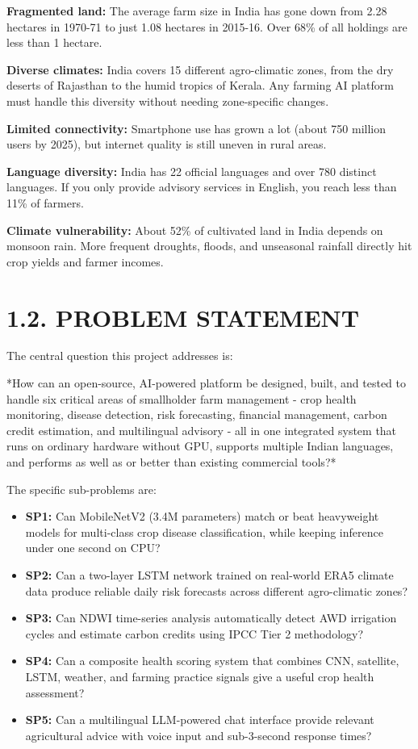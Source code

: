 \documentclass[12pt, a4paper]{report}
\begin{document}
\textbf{Fragmented land:} The average farm size in India has gone down from 2.28 hectares in 1970-71 to just 1.08 hectares in 2015-16. Over 68\% of all holdings are less than 1 hectare.

\textbf{Diverse climates:} India covers 15 different agro-climatic zones, from the dry deserts of Rajasthan to the humid tropics of Kerala. Any farming AI platform must handle this diversity without needing zone-specific changes.

\textbf{Limited connectivity:} Smartphone use has grown a lot (about 750 million users by 2025), but internet quality is still uneven in rural areas.

\textbf{Language diversity:} India has 22 official languages and over 780 distinct languages. If you only provide advisory services in English, you reach less than 11\% of farmers.

\textbf{Climate vulnerability:} About 52\% of cultivated land in India depends on monsoon rain. More frequent droughts, floods, and unseasonal rainfall directly hit crop yields and farmer incomes.

\section{1.2. PROBLEM STATEMENT}
The central question this project addresses is:

*How can an open-source, AI-powered platform be designed, built, and tested to handle six critical areas of smallholder farm management - crop health monitoring, disease detection, risk forecasting, financial management, carbon credit estimation, and multilingual advisory - all in one integrated system that runs on ordinary hardware without GPU, supports multiple Indian languages, and performs as well as or better than existing commercial tools?*

The specific sub-problems are:

\begin{itemize}[leftmargin=*]
  \item \textbf{SP1:} Can MobileNetV2 (3.4M parameters) match or beat heavyweight models for multi-class crop disease classification, while keeping inference under one second on CPU?
  \item \textbf{SP2:} Can a two-layer LSTM network trained on real-world ERA5 climate data produce reliable daily risk forecasts across different agro-climatic zones?
  \item \textbf{SP3:} Can NDWI time-series analysis automatically detect AWD irrigation cycles and estimate carbon credits using IPCC Tier 2 methodology?
  \item \textbf{SP4:} Can a composite health scoring system that combines CNN, satellite, LSTM, weather, and farming practice signals give a useful crop health assessment?
  \item \textbf{SP5:} Can a multilingual LLM-powered chat interface provide relevant agricultural advice with voice input and sub-3-second response times?
\end{itemize}
\end{document}
